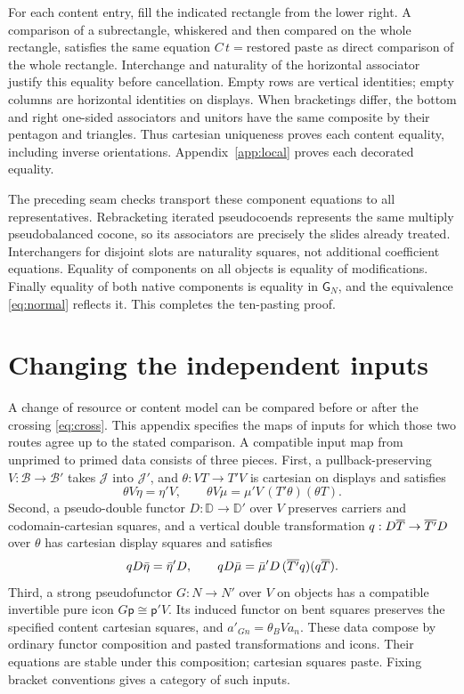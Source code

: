 \documentclass[11pt]{article}
\numberwithin{equation}{section}
\theoremstyle{definition}\newtheorem{definition}[theorem]{Definition}
\newcommand{\B}{\mathcal B}\newcommand{\J}{\mathcal J}
\newcommand{\D}{\mathbb D}\newcommand{\N}{\mathbb N}
\newcommand{\pure}{\mathsf p}\newcommand{\grade}{\mathsf G}
\begin{document}
For each content entry, fill the indicated rectangle from the lower
right. A comparison of a subrectangle, whiskered and then compared on the
whole rectangle, satisfies the same equation
$C\,t=\text{restored paste}$ as direct comparison of the whole rectangle.
Interchange and naturality of the horizontal associator justify this
equality before cancellation. Empty rows are vertical identities; empty
columns are horizontal identities on displays. When bracketings differ,
the bottom and right one-sided associators and unitors have the same
composite by their pentagon and triangles. Thus cartesian uniqueness
proves each content equality, including inverse orientations.
Appendix~\ref{app:local} proves each decorated equality.

The preceding seam checks transport these component equations to all
representatives. Rebracketing iterated pseudocoends represents the same
multiply pseudobalanced cocone, so its associators are precisely the
slides already treated. Interchangers for disjoint slots are naturality
squares, not additional coefficient equations. Equality of components
on all objects is equality of modifications. Finally equality of both
native components is equality in $\grade_N$, and the equivalence
\eqref{eq:normal} reflects it. This completes the ten-pasting proof.

\section{Changing the independent inputs}\label{app:parameters}
A change of resource or content model can be compared before or after
the crossing \eqref{eq:cross}. This appendix specifies the maps of
inputs for which those two routes agree up to the stated comparison.
A compatible input map from unprimed to primed data consists of three pieces.
First, a pullback-preserving $V:\B\to\B'$ takes $\J$ into $\J'$, and
$\theta:VT\to T'V$ is cartesian on displays and satisfies
\[
 \theta V\eta=\eta'V,\qquad
 \theta V\mu=\mu'V\,(T'\theta)(\theta T).
\]
Second, a pseudo-double functor $D:\D\to\D'$ over $V$ preserves
carriers and codomain-cartesian squares, and a vertical double
transformation $q:D\overline T\to\overline{T'}D$ over $\theta$ has cartesian
display squares and satisfies
\[
 qD\bar\eta=\bar\eta'D,\qquad
 qD\bar\mu=\bar\mu'D\,(\overline{T'}q)(q\overline T).
\]
Third, a strong pseudofunctor $G:N\to N'$ over $V$ on objects has a
compatible invertible pure icon $G\pure\cong\pure'V$. Its induced
functor on bent squares preserves the specified content cartesian squares,
and $a'_{Gn}=\theta_BVa_n$. These data compose by ordinary functor
composition and pasted transformations and icons. Their equations are
stable under this composition; cartesian squares paste. Fixing bracket
conventions gives a category of such inputs.
\end{document}
